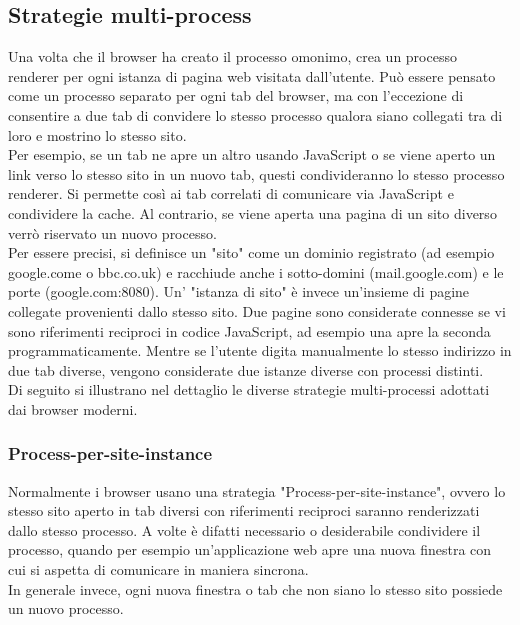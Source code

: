 \subsection{Strategie multi-process}

Una volta che il browser ha creato il processo omonimo, crea un processo renderer per ogni istanza di pagina web visitata dall'utente. Può essere pensato come un processo separato per ogni tab del browser, ma con l'eccezione di consentire a due tab di convidere lo stesso processo qualora siano collegati tra di loro e mostrino lo stesso sito. \\

Per esempio, se un tab ne apre un altro usando JavaScript o se viene aperto un link verso lo stesso sito in un nuovo tab, questi condivideranno lo stesso processo renderer. Si permette così ai tab correlati di comunicare via JavaScript e condividere la cache. Al contrario, se viene aperta una pagina di un sito diverso verrò riservato un nuovo processo. \\

Per essere precisi, si definisce un "sito" come un dominio registrato (ad esempio google.come o bbc.co.uk) e racchiude anche i sotto-domini (mail.google.com) e le porte (google.com:8080). Un' "istanza di sito" è invece un'insieme di pagine collegate provenienti dallo stesso sito. Due pagine sono considerate connesse se vi sono riferimenti reciproci in codice JavaScript, ad esempio una apre la seconda programmaticamente. Mentre se l'utente digita manualmente lo stesso indirizzo in due tab diverse, vengono considerate due istanze diverse con processi distinti. \\

Di seguito si illustrano nel dettaglio le diverse strategie multi-processi adottati dai browser moderni.

\subsubsection{Process-per-site-instance}

Normalmente i browser usano una strategia "Process-per-site-instance", ovvero lo stesso sito aperto in tab diversi con riferimenti reciproci saranno renderizzati dallo stesso processo. A volte è difatti necessario o desiderabile condividere il processo, quando per esempio un'applicazione web apre una nuova finestra con cui si aspetta di comunicare in maniera sincrona. \\

In generale invece, ogni nuova finestra o tab che non siano lo stesso sito possiede un nuovo processo.

